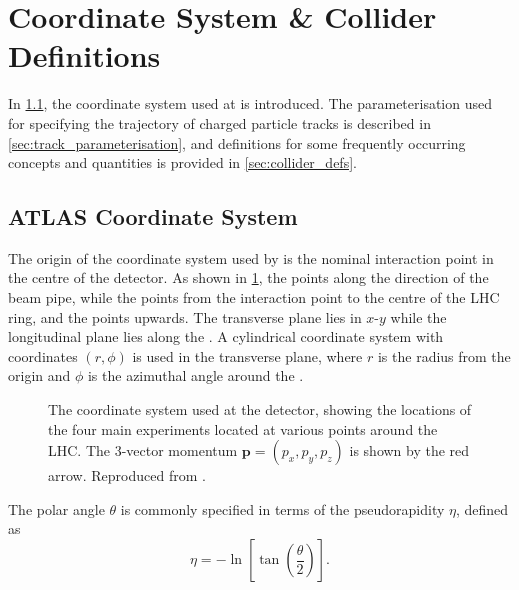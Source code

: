 \section{Coordinate System \& Collider Definitions}\label{sec:atlas_coords}

In \cref{sec:coord_sys}, the coordinate system used at \ATLAS is introduced.
The parameterisation used for specifying the trajectory of charged particle tracks is described in \cref{sec:track_parameterisation}, and definitions for some frequently occurring concepts and quantities is provided in \cref{sec:collider_defs}.

\subsection{ATLAS Coordinate System}\label{sec:coord_sys}


The origin of the coordinate system used by \ATLAS is the nominal interaction point in the centre of the detector.
As shown in \cref{fig:atlas_coord_system}, the  points along the direction of the beam pipe, while the  points from the interaction point to the centre of the LHC ring, and the  points upwards.
The transverse plane lies in $x$\nobreakdash-$y$ while the longitudinal plane lies along the .
A cylindrical coordinate system with coordinates $(r,\phi)$ is used in the transverse plane, where $r$ is the radius from the origin and $\phi$ is the azimuthal angle around the .

\begin{figure}[!htbp]
  \centering
  
  \caption{
    The coordinate system used at the \ATLAS detector, showing the locations of the four main experiments located at various points around the LHC.
    The 3-vector momentum $\bm{p} = (p_x, p_y, p_z)$ is shown by the red arrow.
    Reproduced from .
  }
  \label{fig:atlas_coord_system}
\end{figure}



The polar angle $\theta$ is commonly specified in terms of the pseudorapidity $\eta$, defined as
%
\begin{equation}\label{eq:pseudorap}
  \eta = - \ln \left[ \tan \left( \frac{\theta}{2} \right) \right] .
\end{equation}
%

